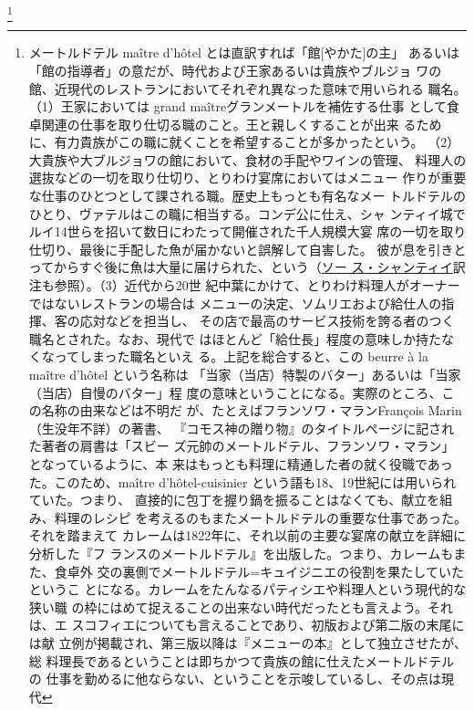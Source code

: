\begin{recette}
\footnote{メートルドテル maître
  d'hôtel とは直訳すれば「館{[}やかた{]}の主」
  あるいは「館の指導者」の意だが、時代および王家あるいは貴族やブルジョ
  ワの館、近現代のレストランにおいてそれぞれ異なった意味で用いられる
  職名。（1）王家においては grand maîtreグランメートルを補佐する仕事
  として食卓関連の仕事を取り仕切る職のこと。王と親しくすることが出来
  るために、有力貴族がこの職に就くことを希望することが多かったという。
  （2）大貴族や大ブルジョワの館において、食材の手配やワインの管理、
  料理人の選抜などの一切を取り仕切り、とりわけ宴席においてはメニュー
  作りが重要な仕事のひとつとして課される職。歴史上もっとも有名なメー
  トルドテルのひとり、ヴァテルはこの職に相当する。コンデ公に仕え、シャ
  ンティイ城でルイ14世らを招いて数日にわたって開催された千人規模大宴
  席の一切を取り仕切り、最後に手配した魚が届かないと誤解して自害した。
  彼が息を引きとってからすぐ後に魚は大量に届けられた、という（\protect\hyperlink{sauce-chantilly}{ソー
  ス・シャンティイ}訳注も参照）。（3）近代から20世
  紀中葉にかけて、とりわけ料理人がオーナーではないレストランの場合は
  メニューの決定、ソムリエおよび給仕人の指揮、客の応対などを担当し、
  その店で最高のサービス技術を誇る者のつく職名とされた。なお、現代で
  はほとんど「給仕長」程度の意味しか持たなくなってしまった職名といえ
  る。上記を総合すると、この beurre à la maître d'hôtel という名称は
  「当家（当店）特製のバター」あるいは「当家（当店）自慢のバター」程
  度の意味ということになる。実際のところ、この名称の由来などは不明だ
  が、たとえばフランソワ・マランFrançois Marin（生没年不詳）の著書、
  『コモス神の贈り物』のタイトルページに記された著者の肩書は「スビー
  ズ元帥のメートルドテル、フランソワ・マラン」となっているように、本
  来はもっとも料理に精通した者の就く役職であった。このため、maître
  d'hôtel-cuisinier という語も18、19世紀には用いられていた。つまり、
  直接的に包丁を握り鍋を振ることはなくても、献立を組み、料理のレシピ
  を考えるのもまたメートルドテルの重要な仕事であった。それを踏まえて
  カレームは1822年に、それ以前の主要な宴席の献立を詳細に分析した『フ
  ランスのメートルドテル』を出版した。つまり、カレームもまた、食卓外
  交の裏側でメートルドテル=キュイジニエの役割を果たしていたというこ
  とになる。カレームをたんなるパティシエや料理人という現代的な狭い職
  の枠にはめて捉えることの出来ない時代だったとも言えよう。それは、エ
  スコフィエについても言えることであり、初版および第二版の末尾には献
  立例が掲載され、第三版以降は『メニューの本』として独立させたが、総
  料理長であるということは即ちかつて貴族の館に仕えたメートルドテルの
  仕事を勤めるに他ならない、ということを示唆しているし、その点は現代
}
\end{recette}

